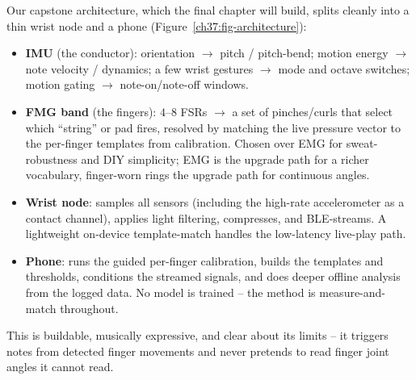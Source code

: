 \begin{goalbox}
Our capstone architecture, which the final chapter will build, splits cleanly into a
thin wrist node and a phone (Figure~\ref{ch37:fig-architecture}):
\begin{itemize}
\item \textbf{IMU} (the conductor): orientation $\to$ pitch / pitch-bend; motion energy
$\to$ note velocity / dynamics; a few wrist gestures $\to$ mode and octave switches;
motion gating $\to$ note-on/note-off windows.
\item \textbf{FMG band} (the fingers): $4$--$8$ FSRs $\to$ a set of pinches/curls
that select which ``string'' or pad fires, resolved by matching the live pressure
vector to the per-finger templates from calibration. Chosen over EMG for
sweat-robustness and DIY simplicity; EMG is the upgrade path for a richer vocabulary,
finger-worn rings the upgrade path for continuous angles.
\item \textbf{Wrist node}: samples all sensors (including the high-rate accelerometer
as a contact channel), applies light filtering, compresses, and BLE-streams. A
lightweight on-device template-match handles the low-latency live-play path.
\item \textbf{Phone}: runs the guided per-finger calibration, builds the templates and
thresholds, conditions the streamed signals, and does deeper offline analysis from the
logged data. No model is trained -- the method is measure-and-match throughout.
\end{itemize}
This is buildable, musically expressive, and clear about its limits -- it triggers
notes from detected finger movements and never pretends to read finger joint angles it
cannot read.
\end{goalbox}

